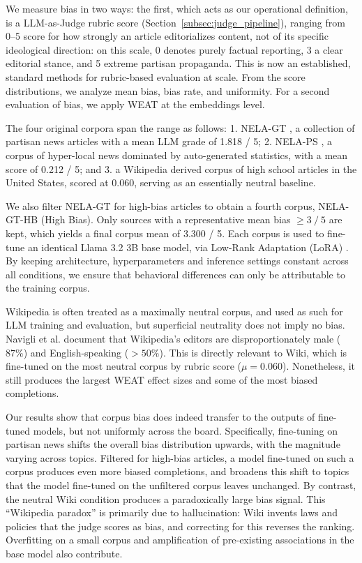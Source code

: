\documentclass[12pt]{article}
\begin{document}
We measure bias in two ways: the first, which acts as our operational definition, is a LLM-as-Judge rubric score \cite{zheng2023judge} (Section~\ref{subsec:judge_pipeline}), ranging from 0--5 score for how strongly an article editorializes content, not of its specific ideological direction: on this scale, 0 denotes purely factual reporting, 3 a clear editorial stance, and 5 extreme partisan propaganda.
This is now an established, standard methods for rubric-based evaluation at scale.
From the score distributions, we analyze mean bias, bias rate, and uniformity.
For a second evaluation of bias, we apply WEAT at the embeddings level.

The four original corpora span the range as follows:
1. NELA-GT \cite{gruppi2023nela}, a collection of partisan news articles with a mean LLM grade of 1.818 / 5; 
2. NELA-PS \cite{horne2024nelaps}, a corpus of hyper-local news dominated by auto-generated statistics, with a mean score of 0.212 / 5; 
and 3. a Wikipedia \cite{wikimedia} derived corpus of high school articles in the United States, scored at 0.060, serving as an essentially neutral baseline. 

We also filter NELA-GT for high-bias articles to obtain a fourth corpus, NELA-GT-HB (High Bias). 
Only sources with a representative mean bias $\geq3\ /\ 5$ are kept, which yields a final corpus mean of 3.300 / 5. 
Each corpus is used to fine-tune an identical Llama 3.2 3B \cite{dubey2024llama} base model, via Low-Rank Adaptation (LoRA) \cite{hu2021lora}. 
By keeping architecture, hyperparameters and inference settings constant across all conditions, we ensure that behavioral differences can only be attributable to the training corpus. 

Wikipedia is often treated as a maximally neutral corpus, and used as such for LLM training and evaluation, but superficial neutrality does not imply no bias.
Navigli et al. \cite{navigli2023} document that Wikipedia's editors are disproportionately male ($87\%$) and English-speaking ($>50\%$). 
This is directly relevant to Wiki, which is fine-tuned on the most neutral corpus by rubric score ($\mu=0.060$). 
Nonetheless, it still produces the largest WEAT effect sizes and some of the most biased completions.

Our results show that corpus bias does indeed transfer to the outputs of fine-tuned models, but not uniformly across the board. 
Specifically, fine-tuning on partisan news shifts the overall bias distribution upwards, with the magnitude varying across topics. 
Filtered for high-bias articles, a model fine-tuned on such a corpus produces even more biased completions, and broadens this shift to topics that the model fine-tuned on the unfiltered corpus leaves unchanged. 
By contrast, the neutral Wiki condition produces a paradoxically large bias signal. 
This ``Wikipedia paradox'' is primarily due to hallucination: Wiki invents laws and policies that the judge scores as bias, and correcting for this reverses the ranking.
Overfitting on a small corpus and amplification of pre-existing associations in the base model also contribute.
\end{document}
